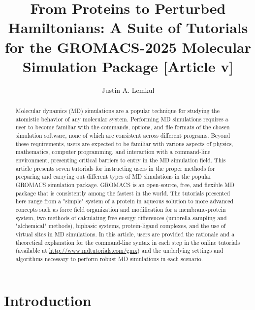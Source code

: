 \documentclass[9pt,tutorial,pubversion]{livecoms}
\title{From Proteins to Perturbed Hamiltonians: A Suite of Tutorials for the GROMACS-2025 Molecular Simulation Package [Article v\versionnumber]}
\author[1*]{Justin A. Lemkul}
\affil[1]{Department of Biochemistry, Virginia Tech, Blacksburg, VA, United States of America}
\newcommand{\urlstring}{http://www.mdtutorials.com/gmx}
\newcommand{\tutorialhomeurl}{\url{\urlstring}}
\begin{document}
\begin{frontmatter}
\maketitle

\begin{abstract}

Molecular dynamics (MD) simulations are a popular technique for studying the atomistic behavior of any molecular system. Performing MD simulations requires a user to become familiar with the commands, options, and file formats of the chosen simulation software, none of which are consistent across different programs. Beyond these requirements, users are expected to be familiar with various aspects of physics, mathematics, computer programming, and interaction with a command-line environment, presenting critical barriers to entry in the MD simulation field. This article presents seven tutorials for instructing users in the proper methods for preparing and carrying out different types of MD simulations in the popular GROMACS simulation package. GROMACS is an open-source, free, and flexible MD package that is consistently among the fastest in the world. The tutorials presented here range from a "simple" system of a protein in aqueous solution to more advanced concepts such as force field organization and modification for a membrane-protein system, two methods of calculating free energy differences (umbrella sampling and "alchemical" methods), biphasic systems, protein-ligand complexes, and the use of virtual sites in MD simulations. In this article, users are provided the rationale and a theoretical explanation for the command-line syntax in each step in the online tutorials (available at \tutorialhomeurl) and the underlying settings and algorithms necessary to perform robust MD simulations in each scenario.

\end{abstract}

\end{frontmatter}


\section{Introduction}
\end{document}

